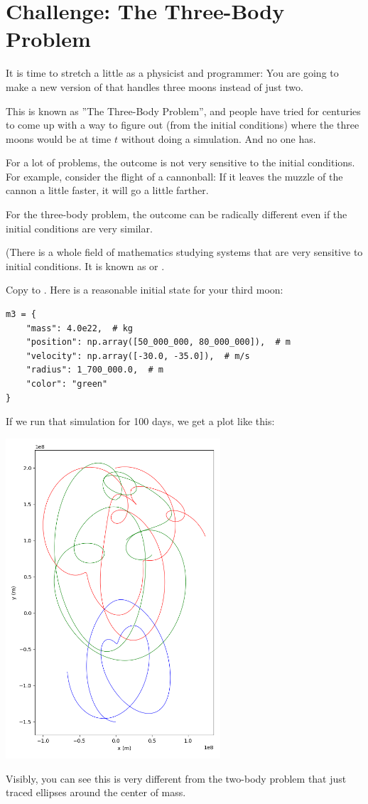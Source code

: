 \section{Challenge: The Three-Body Problem}

It is time to stretch a little as a physicist and programmer:  You are going to make a new version of  that handles three moons instead of just two.

This is known as ''The Three-Body Problem'', and people have tried for centuries to come up with 
a way to figure out (from the initial conditions) where the three moons would be at time $t$ without doing a simulation.  And no one has.

For a lot of problems,  the outcome is not very sensitive to the initial conditions. For example, consider the flight of a
cannonball:  If it leaves the muzzle of the cannon a little faster,  it will go a little farther.

For the three-body problem,  the outcome can be radically different even if the initial conditions are very similar.  

(There is a whole field of mathematics studying systems that are very sensitive to initial conditions.  It is known
as  or .

Copy   to .  Here is a reasonable initial state for your third moon:

\begin{verbatim}
m3 = {
    "mass": 4.0e22,  # kg
    "position": np.array([50_000_000, 80_000_000]),  # m
    "velocity": np.array([-30.0, -35.0]),  # m/s
    "radius": 1_700_000.0,  # m
    "color": "green" 
}  
\end{verbatim}

If we run that simulation for 100 days, we get a plot like this:

\includegraphics[width=0.6\textwidth]{plot3moons_01.png}

Visibly, you can see this is very different from the two-body problem that just traced ellipses around the center of mass.




